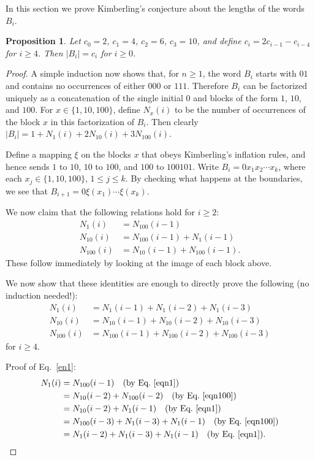 \documentclass[
final
]{dmtcs-episciences}
\theoremstyle{plain}
\newtheorem{proposition}[theorem]{Proposition}
\theoremstyle{definition}
\theoremstyle{remark}
\begin{document}
In this section we prove Kimberling's conjecture about the lengths
of the words $B_i$.

\begin{proposition}
Let $c_0 = 2$, $c_1 = 4$, $c_2 = 6$, $c_3 = 10$, and
define $c_i = 2c_{i-1} - c_{i-4}$ for $i \geq 4$.  Then $|B_i|= c_i$ for $i \geq 0$.
\end{proposition}

\begin{proof}
A simple induction now shows that, for $n \geq 1$, the word $B_i$ starts with $01$
and contains no occurrences of either $000$ or $111$.  Therefore $B_i$ can be
factorized uniquely as a concatenation of the single initial $0$ and blocks of the
form $1$, $10$, and $100$.  For $x \in \{ 1, 10, 100 \}$, define $N_x (i)$ to be
the number of occurrences of the block $x$ in this
factorization of $B_i$.  Then clearly
$|B_i| = 1 + N_1(i) + 2N_{10} (i) + 3N_{100} (i)$.

Define a mapping $\xi$ on the blocks $x$ that obeys Kimberling's inflation 
rules, and hence sends $1$ to $10$, $10$ to $100$, and
$100$ to $100101$.  Write $B_i = 0 x_1 x_2 \cdots x_k$, where each $x_j \in \{ 1, 10, 100 \}$, $1 \leq j \leq k$. By checking what happens at the boundaries, we see that $B_{i+1} = 0 \xi(x_1) \cdots \xi(x_k)$.  

We now claim that the following relations hold for $i \geq 2$:
\begin{align}
N_1 (i) &= N_{100} (i-1) \label{eqn1} \\
N_{10} (i) &= N_{100} (i-1) + N_1 (i-1) \label{eqn10} \\
N_{100} (i) &= N_{10} (i-1) + N_{100} (i-1). \label{eqn100}
\end{align}
These follow immediately by looking at the image of each block above.

We now show that these identities are enough to directly prove the following (no induction needed!):
\begin{align}
N_1 (i) &= N_1(i-1) + N_1(i-2) + N_1(i-3) \label{en1}\\
N_{10} (i) &= N_{10}(i-1) + N_{10}(i-2) + N_{10}(i-3) \label{n10} \\
N_{100} (i) &= N_{100}(i-1) + N_{100}(i-2) + N_{100} (i-3) \label{n100} 
\end{align}
for $i \geq 4$. 

Proof of Eq.~\eqref{en1}:
\begin{align*}
N_1 (i) &= N_{100} (i-1) \quad \text{(by Eq.~\eqref{eqn1})}\\
&= N_{10} (i-2) + N_{100}(i-2)  \quad \text{(by Eq.~\eqref{eqn100})}\\
&= N_{10} (i-2) + N_1(i-1)  \quad \text{(by Eq.~\eqref{eqn1})} \\
&= N_{100} (i-3) + N_1(i-3) + N_1(i-1) \quad \text{(by Eq.~\eqref{eqn100})} \\
&= N_1(i-2) + N_1(i-3) + N_1(i-1) \quad \text{(by Eq.~\eqref{eqn1})} .
\end{align*}


\end{proof}
\end{document}
